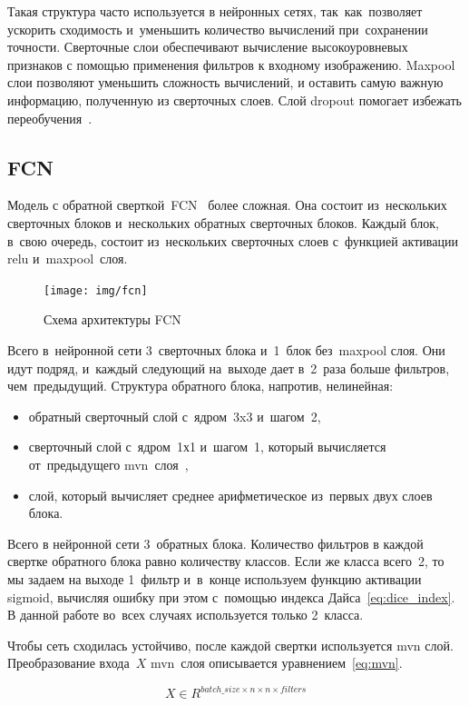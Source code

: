 Такая структура часто используется в нейронных сетях, так~как~позволяет ускорить сходимость и~уменьшить количество вычислений при~сохранении точности. Сверточные слои обеспечивают вычисление высокоуровневых признаков с помощью применения фильтров к входному изображению. Maxpool слои позволяют уменьшить сложность вычислений, и оставить самую важную информацию, полученную из сверточных слоев. Слой dropout помогает избежать переобучения~\cite{dropout}. 

\subsection{FCN}

Модель с обратной сверткой~FCN~\cite{fcn} более сложная. Она состоит из~нескольких сверточных блоков и~нескольких обратных сверточных блоков. Каждый блок, в~свою очередь, состоит из~нескольких сверточных слоев с~функцией активации relu и~maxpool~слоя. 

\begin{figure}[ht]
  \texttt{[image: img/fcn]}
  \caption{Схема архитектуры FCN}
\end{figure}

Всего в~нейронной сети 3~сверточных блока и~1~блок без~maxpool слоя. Они идут подряд, и~каждый следующий на~выходе дает в~2~раза больше фильтров, чем~предыдущий. 
Структура обратного блока, напротив, нелинейная:

\begin{itemize}
  \item обратный сверточный слой с~ядром~3x3 и~шагом~2,
  \item сверточный слой с~ядром~1х1 и~шагом~1, который вычисляется от~предыдущего mvn~слоя~\cite{batch_norm},
  \item слой, который вычисляет среднее арифметическое из~первых двух слоев блока.
\end{itemize}

Всего в нейронной сети 3~обратных блока. 
Количество фильтров в каждой свертке обратного блока 
равно количеству классов. Если же класса всего~2, 
то мы задаем на выходе 1~фильтр и~в~конце используем 
функцию активации sigmoid, вычисляя ошибку при этом 
с~помощью индекса Дайса~\eqref{eq:dice_index}. 
В данной работе во~всех случаях используется только 2~класса.

Чтобы сеть сходилась устойчиво, после каждой свертки 
используется mvn слой. Преобразование входа~$X$ mvn~слоя 
описывается уравнением~\eqref{eq:mvn}. 

\begin{equation}
\label{eq:mvn_input_batch}
X\in{}R^{batch\_size\times{}n\times{}n\times{}filters}
\end{equation}

